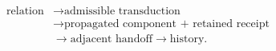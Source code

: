 \setcounter{equation}{0}
\begin{equation}
\begin{aligned}
\text{relation}&\longrightarrow\text{admissible transduction}\\
&\longrightarrow\text{propagated component + retained receipt}\\
&\longrightarrow\text{adjacent handoff}\longrightarrow\text{history}.
\end{aligned}
\end{equation}
